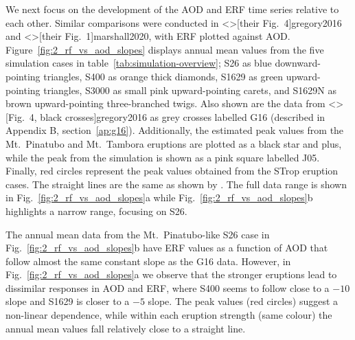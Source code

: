 \documentclass[draft]{agujournal2019}
\begin{document}
  We next focus on the development of the AOD and ERF time series relative to each
  other. Similar comparisons were conducted in \citeA<>[their Fig.\ 4]{gregory2016} and
  \citeA<>[their Fig.\ 1]{marshall2020}, with ERF plotted against AOD.
  Figure~\ref{fig:2_rf_vs_aod_slopes} displays annual mean values from the five
  simulation cases in table~\ref{tab:simulation-overview}; S26 as blue downward-pointing
  triangles, S400 as orange thick diamonds, S1629 as green upward-pointing triangles,
  S3000 as small pink upward-pointing carets, and S1629N as brown upward-pointing
  three-branched twigs. Also shown are the data from \citeA<>[Fig.\ 4, black
    crosses]{gregory2016} as grey crosses labelled G16 (described in Appendix B,
  section~\ref{ap:g16}). Additionally, the estimated peak values from the Mt.\ Pinatubo
  and Mt.\ Tambora eruptions are plotted as a black star and plus, while the peak from
  the  simulation is shown as a pink square labelled J05. Finally, red
  circles represent the peak values obtained from the STrop eruption cases. The straight
  lines are the same as shown by . The full data range is shown in
  Fig.~\ref{fig:2_rf_vs_aod_slopes}a while Fig.~\ref{fig:2_rf_vs_aod_slopes}b highlights
  a narrow range, focusing on S26.

  The annual mean data from the Mt.\ Pinatubo-like S26 case in
  Fig.~\ref{fig:2_rf_vs_aod_slopes}b have ERF values as a function of AOD that follow
  almost the same constant slope as the G16 data. However, in
  Fig.~\ref{fig:2_rf_vs_aod_slopes}a we observe that the stronger eruptions lead to
  dissimilar responses in AOD and ERF, where S400 seems to follow close to a \(-10\)
  slope and S1629 is closer to a \(-5\) slope. The peak values (red circles) suggest a
  non-linear dependence, while within each eruption strength (same colour) the annual
  mean values fall relatively close to a straight line.
\end{document}
